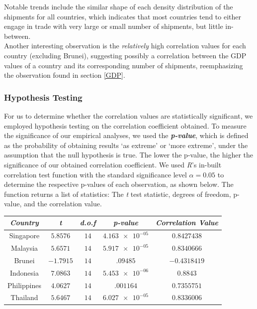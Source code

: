 \documentclass{article}
\begin{document}
\noindent Notable trends include the similar shape of each density distribution of the shipments for all countries, which indicates that most countries tend to either engage in trade with very large or small number of shipments, but little in-between. \\

\noindent Another interesting observation is the \textit{relatively} high correlation values for each country (excluding Brunei), suggesting possibly a correlation between the GDP values of a country and its corresponding number of shipments, reemphasizing the observation found in section \ref{GDP}.

\subsubsection{Hypothesis Testing} \label{HypoTest}
For us to determine whether the correlation values are statistically significant, we employed hypothesis testing on the correlation coefficient obtained. To measure the significance of our empirical analyses, we used the \textbf{\textit{p-value}}, which is defined as the probability of obtaining results ‘as extreme’ or ‘more extreme’, under the assumption that the null hypothesis is true. The lower the p-value, the higher the significance of our obtained correlation coefficient. We used \textit{R}'s in-built correlation test function with the standard significance level $\alpha = 0.05$ to determine the respective p-values of each observation, as shown below. The function returns a list of statistics: The \textit{t} test statistic, degrees of freedom, p-value, and the correlation value. 

\begin{center}
\begin{tabular}{ |c|c|c|c|c| } 
 \hline
    \textit{\textbf{Country}} & \textit{\textbf{t}} & \textit{\textbf{d.o.f}} & \textit{\textbf{p-value}} & \textit{\textbf{Correlation Value}} \\
    \hline
    Singapore & $5.8576$ & $14$ & $\num{4.163e-05}$ & $0.8427438$  \\
    \hline
    Malaysia & $5.6571$ & $14$ & $\num{5.917e-05}$ & $0.8340666$ \\
    \hline
    Brunei & $-1.7915$ & $14$ & $\num{.09485}$ & $-0.4318419$  \\
    \hline
    Indonesia & $7.0863$ & $14$ & $\num{5.453e-06}$ & $0.8843$  \\
    \hline
    Philippines & $4.0627$ & $14$ & $\num{.001164}$ & $0.7355751$  \\
    \hline
    Thailand & $5.6467$ & $14$ & $\num{6.027e-05}$ & $0.8336006$  \\
    \hline
\end{tabular}
\end{center} 
\end{document}
